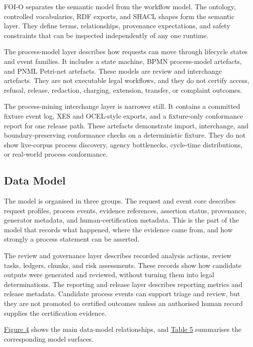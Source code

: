 \documentclass[
]{article}
\begin{document}
FOI-O separates the semantic model from the workflow model. The
ontology, controlled vocabularies, RDF exports, and SHACL shapes form
the semantic layer. They define terms, relationships, provenance
expectations, and safety constraints that can be inspected independently
of any one runtime.

The process-model layer describes how requests can move through
lifecycle states and event families. It includes a state machine, BPMN
process-model artefacts, and PNML Petri-net artefacts. These models are
review and interchange artefacts. They are not executable legal
workflows, and they do not certify access, refusal, release, redaction,
charging, extension, transfer, or complaint outcomes.

The process-mining interchange layer is narrower still. It contains a
committed fixture event log, XES and OCEL-style exports, and a
fixture-only conformance report for one release path. These artefacts
demonstrate import, interchange, and boundary-preserving conformance
checks on a deterministic fixture. They do not show live-corpus process
discovery, agency bottlenecks, cycle-time distributions, or real-world
process conformance.

\subsection{Data Model}\label{data-model}

The model is organised in three groups. The request and event core
describes request profiles, process events, evidence references,
assertion status, provenance, generator metadata, and
human-certification metadata. This is the part of the model that records
what happened, where the evidence came from, and how strongly a process
statement can be asserted.

The review and governance layer describes recorded analysis actions,
review tasks, ledgers, chunks, and risk assessments. These records show
how candidate outputs were generated and reviewed, without turning them
into legal determinations. The reporting and release layer describes
reporting metrics and release metadata. Candidate process events can
support triage and review, but they are not promoted to certified
outcomes unless an authorised human record supplies the certification
evidence.

\hyperlink{fig-data-model}{Figure 4} shows the main data-model
relationships, and \hyperlink{tab-data-model-surfaces}{Table 5}
summarises the corresponding model surfaces.
\end{document}
